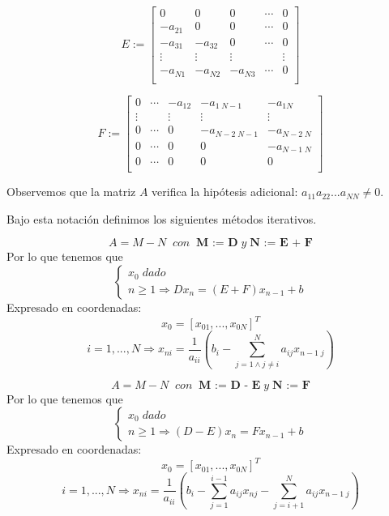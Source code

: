 \[ E := \begin{bmatrix}
0 & 0 & 0 & \cdots & 0 \\
-a_{21} & 0 & 0 & \cdots & 0 \\
-a_{31} & -a_{32} & 0 & \cdots & 0 \\
\vdots & \vdots & \vdots & & \vdots \\
-a_{N1} & -a_{N2} & -a_{N3} & \cdots & 0 \\
\end{bmatrix} \]

\[ F := \begin{bmatrix}
0 & \cdots & -a_{12} & -a_{1 \; N-1} & -a_{1N} \\
\vdots & & \vdots & \vdots & \vdots \\
0 & \cdots & 0 & -a_{N-2 \; N-1} & -a_{N-2 \; N} \\
0 & \cdots & 0 & 0 & -a_{N-1 \; N} \\
0 & \cdots & 0 & 0 & 0 \\
\end{bmatrix} \]

Observemos que la matriz $A$ verifica la hipótesis adicional: $a_{11}a_{22}...a_{NN} \neq 0$.

Bajo esta notación definimos los siguientes métodos iterativos.

\begin{ndef}
\[ A = M - N \; \; con \; \; \textbf{M := D} \; y \; \textbf{N := E + F} \]
Por lo que tenemos que
\[ \left\{ \begin{array}{c}
x_0 \; dado \\
n \geq 1 \Rightarrow Dx_n = (E+F)x_{n-1} + b
\end{array}
\right. \]
Expresado en coordenadas:
\[
x_0 = \left[ x_{01},...,x_{0N} \right] ^T
\]
\[
i = 1,...,N \Rightarrow x_{ni} = \frac{1}{a_{ii}} \left( b_i - \sum_{j=1 \wedge j \neq i}^N a_{ij}x_{n-1 \; j} \right)
\]

\end{ndef}

\begin{ndef}
\[ A = M - N \; \; con \; \; \textbf{M := D - E} \; y \; \textbf{N := F} \]
Por lo que tenemos que
\[ \left\{ \begin{array}{c}
x_0 \; dado \\
n \geq 1 \Rightarrow (D-E)x_n = Fx_{n-1} + b
\end{array}
\right. \]
Expresado en coordenadas:
\[
x_0 = \left[ x_{01},...,x_{0N} \right] ^T
\]
\[
i = 1,...,N \Rightarrow x_{ni} = \frac{1}{a_{ii}} \left( b_i - \sum_{j=1}^{i-1} a_{ij}x_{nj} - \sum_{j=i+1}^N a_{ij}x_{n-1 \; j} \right)
\]
\end{ndef}

